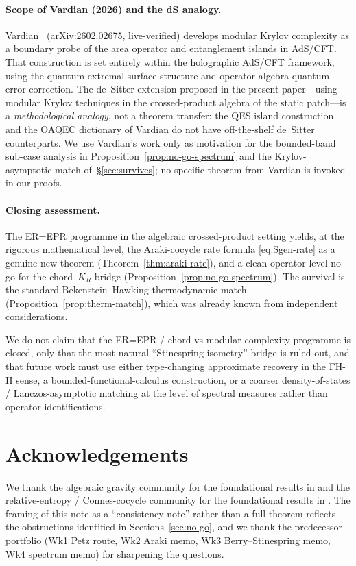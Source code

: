 \documentclass[12pt,a4paper]{article}
\theoremstyle{definition}
\begin{document}
\paragraph{Scope of Vardian (2026) and the dS analogy.}
Vardian~\cite{Vardian2026} (arXiv:2602.02675, live-verified) develops
modular Krylov complexity as a boundary probe of the area operator and
entanglement islands in AdS/CFT.
That construction is set entirely within the holographic AdS/CFT framework,
using the quantum extremal surface structure and operator-algebra quantum error
correction.
The de~Sitter extension proposed in the present paper---using modular
Krylov techniques in the crossed-product algebra of the static patch---is a
\emph{methodological analogy}, not a theorem transfer: the QES island
construction and the OAQEC dictionary of Vardian do not have off-the-shelf
de~Sitter counterparts.
We use Vardian's work only as motivation for the bounded-band sub-case
analysis in Proposition~\ref{prop:no-go-spectrum} and the Krylov-asymptotic
match of~\S\ref{sec:survives}; no specific theorem from Vardian is invoked
in our proofs.

\paragraph{Closing assessment.}
The ER=EPR programme in the algebraic crossed-product setting yields,
at the rigorous mathematical level, the Araki-cocycle rate formula
\eqref{eq:Sgen-rate} as a genuine new theorem (Theorem~\ref{thm:araki-rate}),
and a clean operator-level no-go for the chord--$K_R$ bridge
(Proposition~\ref{prop:no-go-spectrum}). The survival is the standard
Bekenstein--Hawking thermodynamic match (Proposition~\ref{prop:therm-match}),
which was already known from independent considerations.

We do not claim that the ER=EPR / chord-vs-modular-complexity programme
is closed, only that the most natural ``Stinespring isometry'' bridge is
ruled out, and that future work must use either type-changing approximate
recovery in the FH-II sense, a bounded-functional-calculus construction,
or a coarser density-of-states / Lanczos-asymptotic matching at the level
of spectral measures rather than operator identifications.

\section*{Acknowledgements}
We thank the algebraic gravity community for the foundational results in
\cite{Witten2022,CLPW2023,FaulknerSperanza2024,DEHK2025a,HPS2024,HOPSW2025}
and the relative-entropy / Connes-cocycle community for the foundational
results in \cite{Araki1976,PuszWoronowicz1978,BR2,Uhlmann1977,Lindblad1974}.
The framing of this note as a ``consistency note'' rather than a
full theorem reflects the obstructions identified in
Sections~\ref{sec:no-go}, and we thank the predecessor portfolio (Wk1
Petz route, Wk2 Araki memo, Wk3 Berry--Stinespring memo, Wk4 spectrum
memo) for sharpening the questions.
\end{document}

